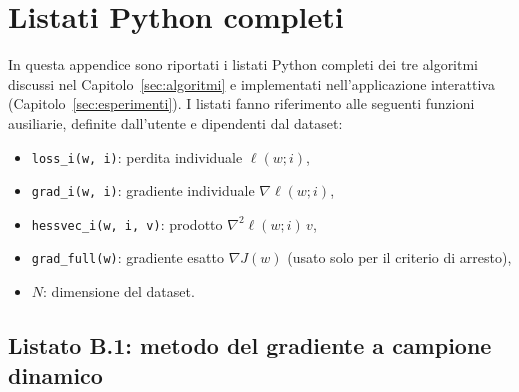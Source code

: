 \section{Listati Python completi}\label{app:listati}

In questa appendice sono riportati i listati Python completi dei tre algoritmi
discussi nel Capitolo~\ref{sec:algoritmi} e implementati nell'applicazione
interattiva (Capitolo~\ref{sec:esperimenti}). I listati fanno riferimento alle
seguenti funzioni ausiliarie, definite dall'utente e dipendenti dal dataset:

\begin{itemize}
  \item \texttt{loss\_i(w, i)}: perdita individuale $\ell(w;i)$,
  \item \texttt{grad\_i(w, i)}: gradiente individuale $\nabla\ell(w;i)$,
  \item \texttt{hessvec\_i(w, i, v)}: prodotto $\nabla^2\ell(w;i)\,v$,
  \item \texttt{grad\_full(w)}: gradiente esatto $\nabla J(w)$ (usato solo per
  il criterio di arresto),
  \item $N$: dimensione del dataset.
\end{itemize}

\subsection{Listato B.1: metodo del gradiente a campione dinamico}

